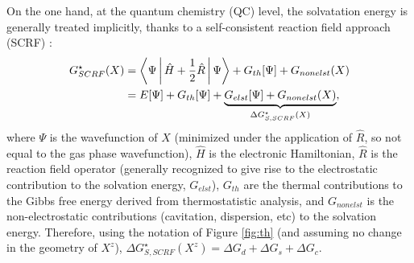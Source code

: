 \documentclass[review]{elsarticle}
\begin{document}
On the one hand, at the quantum chemistry (QC) level, the solvatation energy is generally treated implicitly, thanks to a self-consistent reaction field approach (SCRF) \cite{herbertDielectricContinuumMethods2021}: \begin{align}
	G^\star_{SCRF}(X) &= \Braket{\Psi|{\hat{H}+\frac{1}{2}\hat{R}}|\Psi} + G_{th}[\Psi] + G_{nonelst}(X) \nonumber\\
	&= E[\Psi] + G_{th}[\Psi] + \underbrace{G_{elst}[\Psi] + G_{nonelst}(X)}_{\Delta G^\star_{S,SCRF}(X)}, \label{eq:scrf}
\end{align}
where $\Psi$ is the wavefunction of $X$ (minimized under the application of $\hat R$, so not equal to the gas phase wavefunction), $\hat H$ is the electronic Hamiltonian, $\hat R$ is the reaction field operator (generally recognized to give rise to the electrostatic contribution to the solvation energy, $G_{elst}$), $G_{th}$ are the thermal contributions to the Gibbs free energy derived from thermostatistic analysis, and $G_{nonelst}$ is the non-electrostatic contributions (cavitation, dispersion, etc) to the solvation energy. Therefore, using the notation of Figure \ref{fig:th} (and assuming no change in the geometry of $X^z$), $ \Delta G^\star_{S,SCRF}(X^z) = \Delta G_d + \Delta G_s + \Delta G_{c}$.  
\end{document}
